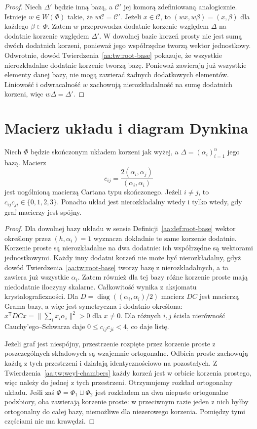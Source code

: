 \begin{proof}
Niech $\Delta'$ będzie inną bazą, a $\mathcal C'$
jej komorą zdefiniowaną analogicznie. Istnieje
$w\in W(\Phi)$ takie, że $w\mathcal C=\mathcal C'$.
Jeżeli $x\in\mathcal C$, to
$(wx,w\beta)=(x,\beta)$ dla każdego $\beta\in\Phi$.
Zatem $w$ przeprowadza dodatnie korzenie względem
$\Delta$ na dodatnie korzenie względem $\Delta'$.
W dowolnej bazie korzeń prosty nie jest sumą dwóch
dodatnich korzeni, ponieważ jego współrzędne
tworzą wektor jednostkowy. Odwrotnie, dowód
Twierdzenia~\ref{aa:tw:root-base} pokazuje, że wszystkie
nierozkładalne dodatnie korzenie tworzą bazę.
Ponieważ zawierają już wszystkie elementy danej
bazy, nie mogą zawierać żadnych dodatkowych elementów.
Liniowość i odwracalność $w$ zachowują nierozkładalność
na sumę dodatnich korzeni, więc $w\Delta=\Delta'$.
\end{proof}

\section{Macierz układu i diagram Dynkina}

\begin{twierdzenie}
\label{aa:tw:root-cartan}
Niech $\Phi$ będzie skończonym układem korzeni jak wyżej,
a $\Delta=(\alpha_i)_{i=1}^n$ jego bazą.
Macierz
\[
 c_{ij}=\frac{2(\alpha_i,\alpha_j)}{(\alpha_i,\alpha_i)}
\]
jest uogólnioną macierzą Cartana typu skończonego.
Jeżeli $i\ne j$, to $c_{ij}c_{ji}\in\{0,1,2,3\}$.
Ponadto układ jest nierozkładalny wtedy i tylko wtedy,
gdy graf macierzy jest spójny.
\end{twierdzenie}
\begin{proof}
Dla dowolnej bazy układu w sensie
Definicji~\ref{aa:def:root-base} wektor określony przez
$(h,\alpha_i)=1$ wyznacza dokładnie te same korzenie
dodatnie. Korzenie proste są nierozkładalne na dwa
dodatnie: ich współrzędne są wektorami jednostkowymi.
Każdy inny dodatni korzeń nie może być nierozkładalny,
gdyż dowód Twierdzenia~\ref{aa:tw:root-base} tworzy
bazę z nierozkładalnych, a ta zawiera już wszystkie
$\alpha_i$. Zatem również dla tej bazy różne
korzenie proste mają niedodatnie iloczyny skalarne.
Całkowitość wynika z aksjomatu krystalograficzności.
Dla $D=\operatorname{diag}((\alpha_i,\alpha_i)/2)$
macierz $DC$ jest macierzą Grama bazy, a więc jest
symetryczna i dodatnio określona:
$x^{\mathsf T}DCx=\|\sum_i x_i\alpha_i\|^2>0$
dla $x\ne0$.
Dla różnych $i,j$ ścisła nierówność Cauchy'ego--Schwarza
daje $0\le c_{ij}c_{ji}<4$, co daje listę.

Jeżeli graf jest niespójny, przestrzenie rozpięte
przez korzenie proste z poszczególnych składowych
są wzajemnie ortogonalne. Odbicia proste zachowują
każdą z tych przestrzeni i działają identycznościowo
na pozostałych. Z Twierdzenia~\ref{aa:tw:weyl-chambers}
każdy korzeń jest w orbicie korzenia prostego,
więc należy do jednej z tych przestrzeni.
Otrzymujemy rozkład ortogonalny układu.
Jeśli zaś $\Phi=\Phi_1\sqcup\Phi_2$ jest rozkładem
na dwa niepuste ortogonalne podzbiory, oba zawierają
korzenie proste: w przeciwnym razie jeden z nich
byłby ortogonalny do całej bazy, niemożliwe dla
niezerowego korzenia. Pomiędzy tymi częściami
nie ma krawędzi.
\end{proof}

